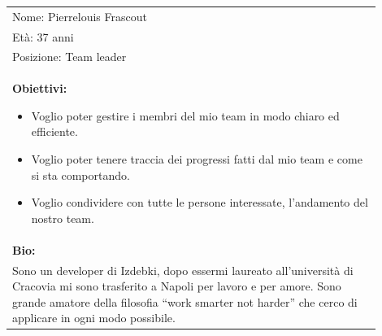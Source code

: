 \documentclass[a4paper, 11pt]{article}
\begin{document}
\begin{table}[H]
    \centering
    \begin{tabular}{|p{0.9\linewidth}|}
        \hline
        Nome: Pierrelouis Frascout                                                                                                                                                                                                                      \\
        Età: 37 anni                                                                                                                                                                                                                                    \\
        Posizione: Team leader                                                                                                                                                                                                                          \\
        \hline
        \begin{minipage}[t]{\linewidth}
            \textbf{Obiettivi:}
            \begin{itemize}
                \item Voglio poter gestire i membri del mio team in modo chiaro ed efficiente.
                \item Voglio poter tenere traccia dei progressi fatti dal mio team e come si sta comportando.
                \item Voglio condividere con tutte le persone interessate, l'andamento del nostro team.
            \end{itemize}
        \end{minipage}                                                                                                                                                                                                                  \\
        \hline
        \textbf{Bio:}                                                                                                                                                                                                                                   \\
        Sono un developer di Izdebki, dopo essermi laureato all'università di Cracovia mi sono trasferito a Napoli per lavoro e per amore. Sono grande amatore della filosofia “work smarter not harder” che cerco di applicare in ogni modo possibile. \\
        \hline
    \end{tabular}
\end{table}
\end{document}
